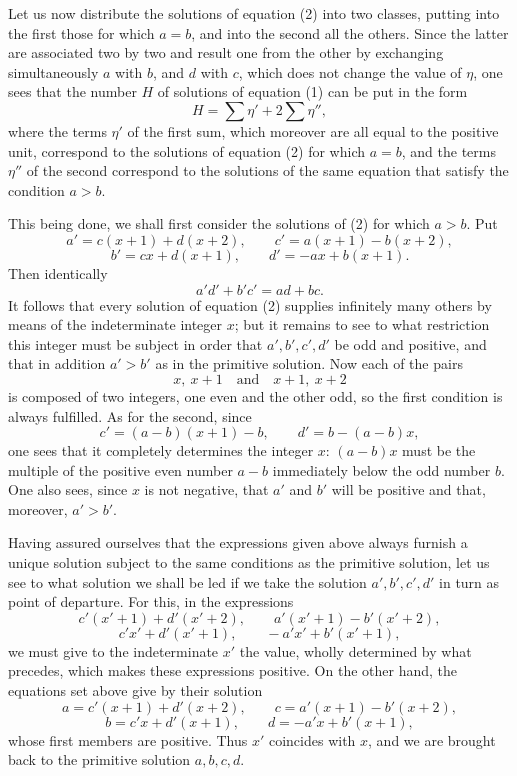 \documentclass[11pt]{article}
\begin{document}
Let us now distribute the solutions of equation (2) into two classes, putting into the first those for which \(a=b\), and into the second all the others. Since the latter are associated two by two and result one from the other by exchanging simultaneously \(a\) with \(b\), and \(d\) with \(c\), which does not change the value of \(\eta\), one sees that the number \(H\) of solutions of equation (1) can be put in the form
\[
H=\sum\eta' + 2\sum\eta'',
\]
where the terms \(\eta'\) of the first sum, which moreover are all equal to the positive unit, correspond to the solutions of equation (2) for which \(a=b\), and the terms \(\eta''\) of the second correspond to the solutions of the same equation that satisfy the condition \(a>b\).

This being done, we shall first consider the solutions of (2) for which \(a>b\). Put
\[
a'=c(x+1)+d(x+2),\qquad c'=a(x+1)-b(x+2),
\]
\[
b'=cx+d(x+1),\qquad d'=-ax+b(x+1).
\]
Then identically
\[
a'd'+b'c'=ad+bc.
\]
It follows that every solution of equation (2) supplies infinitely many others by means of the indeterminate integer \(x\); but it remains to see to what restriction this integer must be subject in order that \(a',b',c',d'\) be odd and positive, and that in addition \(a'>b'\) as in the primitive solution. Now each of the pairs
\[
x,\ x+1\quad\text{and}\quad x+1,\ x+2
\]
is composed of two integers, one even and the other odd, so the first condition is always fulfilled. As for the second, since
\[
c'=(a-b)(x+1)-b,\qquad d'=b-(a-b)x,
\]
one sees that it completely determines the integer \(x\): \((a-b)x\) must be the multiple of the positive even number \(a-b\) immediately below the odd number \(b\). One also sees, since \(x\) is not negative, that \(a'\) and \(b'\) will be positive and that, moreover, \(a'>b'\).

Having assured ourselves that the expressions given above always furnish a unique solution subject to the same conditions as the primitive solution, let us see to what solution we shall be led if we take the solution \(a',b',c',d'\) in turn as point of departure. For this, in the expressions
\[
c'(x'+1)+d'(x'+2),\qquad a'(x'+1)-b'(x'+2),
\]
\[
c'x'+d'(x'+1),\qquad -a'x'+b'(x'+1),
\]
we must give to the indeterminate \(x'\) the value, wholly determined by what precedes, which makes these expressions positive. On the other hand, the equations set above give by their solution
\[
a=c'(x+1)+d'(x+2),\qquad c=a'(x+1)-b'(x+2),
\]
\[
b=c'x+d'(x+1),\qquad d=-a'x+b'(x+1),
\]
whose first members are positive. Thus \(x'\) coincides with \(x\), and we are brought back to the primitive solution \(a,b,c,d\).
\end{document}
